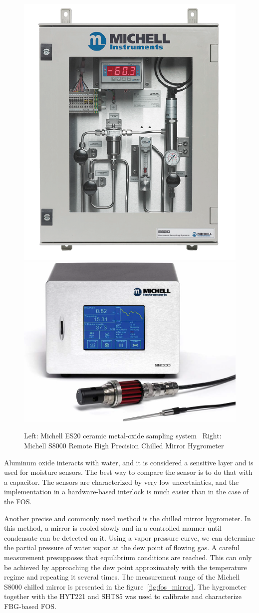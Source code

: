 \begin{figure}[!h]
\centering
\includegraphics[width=0.35\columnwidth]{Chapter5/images/ES20.png}
\includegraphics[width=0.4\columnwidth]{Chapter5/images/s8000.png}
\caption{Left: Michell ES20 ceramic metal-oxide sampling system~\cite{michell_e20}
Right: Michell S8000 Remote High Precision Chilled Mirror Hygrometer~\cite{michell_s8000}}
\label{fig:sniffer}
\end{figure}
Aluminum oxide interacts with water, and it is considered a sensitive layer and is used for moisture sensors. The best way to compare the sensor is to do that with a capacitor. The sensors are characterized by very low uncertainties, and the implementation in a hardware-based interlock is much easier than in the case of the \gls{FOS}.

Another precise and commonly used method is the chilled mirror hygrometer. In this method, a mirror is cooled slowly and in a controlled manner until condensate can be detected on it. Using a vapor pressure curve, we can determine the partial pressure of water vapor at the dew point of flowing gas. A careful measurement presupposes that equilibrium conditions are reached. This can only be achieved by approaching the dew point approximately with the temperature regime and repeating it several times. The measurement range of the Michell S8000 chilled mirror is presented in the figure~\ref{fig:fos_mirror}. The hygrometer together with the HYT221 and SHT85 was used to calibrate and characterize FBG-based \gls{FOS}. 

